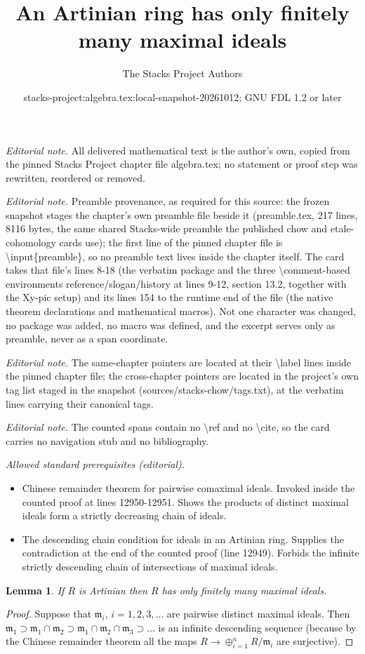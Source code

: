 \documentclass[10pt,a4paper]{amsart}
\title{An Artinian ring has only finitely many maximal ideals}
\author{The Stacks Project Authors}
\date{stacks-project:algebra.tex:local-snapshot-20261012; GNU FDL 1.2 or later}
\theoremstyle{plain}
\newtheorem{lemma}[subsection]{Lemma}
\theoremstyle{definition}
\theoremstyle{remark}
\numberwithin{equation}{subsection}
\begin{document}
\maketitle
\noindent\textit{Editorial note.} All delivered mathematical text is the author's own, copied from the pinned Stacks Project chapter file algebra.tex; no statement or proof step was rewritten, reordered or removed.\par\medskip
\noindent\textit{Editorial note.} Preamble provenance, as required for this source: the frozen snapshot stages the chapter's own preamble file beside it (preamble.tex, 217 lines, 8116 bytes, the same shared Stacks-wide preamble the published chow and etale-cohomology cards use); the first line of the pinned chapter file is \textbackslash{}input\{preamble\}, so no preamble text lives inside the chapter itself. The card takes that file's lines 8-18 (the verbatim package and the three \textbackslash{}comment-based environments reference/slogan/history at lines 9-12, section 13.2, together with the Xy-pic setup) and its lines 154 to the runtime end of the file (the native theorem declarations and mathematical macros). Not one character was changed, no package was added, no macro was defined, and the excerpt serves only as preamble, never as a span coordinate.\par\medskip
\noindent\textit{Editorial note.} The same-chapter pointers are located at their \textbackslash{}label lines inside the pinned chapter file; the cross-chapter pointers are located in the project's own tag list staged in the snapshot (sources/stacks-chow/tags.txt), at the verbatim lines carrying their canonical tags.\par\medskip
\noindent\textit{Editorial note.} The counted spans contain no \textbackslash{}ref and no \textbackslash{}cite, so the card carries no navigation stub and no bibliography.\par\medskip
\noindent\textit{Allowed standard prerequisites (editorial).}\begin{itemize}
\item Chinese remainder theorem for pairwise comaximal ideals. Invoked inside the counted proof at lines 12950-12951. Shows the products of distinct maximal ideals form a strictly decreasing chain of ideals.
\item The descending chain condition for ideals in an Artinian ring. Supplies the contradiction at the end of the counted proof (line 12949). Forbids the infinite strictly descending chain of intersections of maximal ideals.
\end{itemize}\medskip
\begin{lemma}
\label{lemma-artinian-finite-nr-max}
If $R$ is Artinian then $R$ has only finitely many maximal ideals.
\end{lemma}

\begin{proof}
Suppose that $\mathfrak m_i$, $i = 1, 2, 3, \ldots$ are
pairwise distinct maximal ideals.
Then $\mathfrak m_1 \supset \mathfrak m_1\cap \mathfrak m_2
\supset \mathfrak m_1 \cap \mathfrak m_2 \cap \mathfrak m_3 \supset \ldots$
is an infinite descending sequence (because by the Chinese
remainder theorem all the maps $R \to \oplus_{i = 1}^n R/\mathfrak m_i$
are surjective).
\end{proof}
\end{document}
